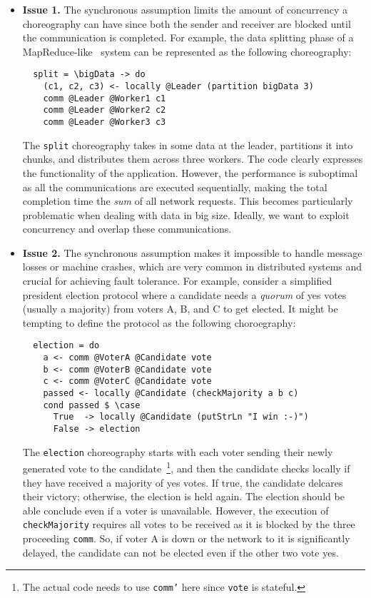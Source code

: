 \begin{itemize}
  \item
  \textbf{Issue 1.} The synchronous assumption limits the amount of concurrency a choreography can have since both the sender and receiver are blocked until the communication is completed.
  For example, the data splitting phase of a MapReduce-like~\citep{map-reduce} system can be represented as the following choreography:
  \begin{verbatim}
  split = \bigData -> do
    (c1, c2, c3) <- locally @Leader (partition bigData 3)
    comm @Leader @Worker1 c1
    comm @Leader @Worker2 c2
    comm @Leader @Worker3 c3
  \end{verbatim}
  The \texttt{split} choreography takes in some data at the leader, partitions it into chunks, and distributes them across three workers.  
  The code clearly expresses the functionality of the application.
  However, the performance is suboptimal as all the communications are executed sequentially, making the total completion time the \emph{sum} of all network requests.
  This becomes particularly problematic when dealing with data in big size.
  Ideally, we want to exploit concurrency and overlap these communications.

  \item
  \textbf{Issue 2.} The synchronous assumption makes it impossible to handle message losses or machine crashes, which are very common in distributed systems and crucial for achieving fault tolerance.
  For example, consider a simplified president election protocol where a candidate needs a \emph{quorum} of yes votes (usually a majority) from voters A, B, and C to get elected.
  It might be tempting to define the protocol as the following choroegraphy:
  \begin{verbatim}
  election = do
    a <- comm @VoterA @Candidate vote
    b <- comm @VoterB @Candidate vote
    c <- comm @VoterC @Candidate vote
    passed <- locally @Candidate (checkMajority a b c)
    cond passed $ \case
      True  -> locally @Candidate (putStrLn "I win :-)")
      False -> election
  \end{verbatim}    
  The \texttt{election} choreography starts with each voter sending their newly generated vote to the candidate~\footnote{The actual code needs to use \texttt{comm'} here since \texttt{vote} is stateful.}, and then the candidate checks locally if they have received a majority of yes votes.
  If true, the candidate delcares their victory; otherwise, the election is held again.
  The election should be able conclude even if a voter is unavailable.
  However, the execution of \texttt{checkMajority} requires all votes to be received as it is blocked by the three proceeding \texttt{comm}.
  So, if voter A is down or the network to it is significantly delayed, the candidate can not be elected even if the other two vote yes.
\end{itemize}

